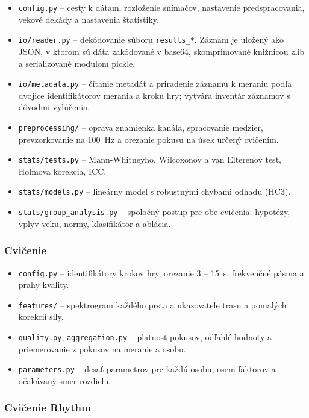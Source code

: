 \documentclass[12pt,a4paper]{article}
\begin{document}
\begin{itemize}
  \item \texttt{config.py} -- cesty k dátam, rozloženie snímačov, nastavenie predspracovania, vekové dekády
        a nastavenia štatistiky.
  \item \texttt{io/reader.py} -- dekódovanie súboru \texttt{results\_*}. Záznam je uložený ako JSON, v ktorom sú
        dáta zakódované v base64, skomprimované knižnicou zlib a serializované modulom pickle.
  \item \texttt{io/metadata.py} -- čítanie metadát a priradenie záznamu k meraniu podľa dvojice identifikátorov
        merania a kroku hry; vytvára inventár záznamov s dôvodmi vylúčenia.
  \item \texttt{preprocessing/} -- oprava znamienka kanála, spracovanie medzier, prevzorkovanie na 100~Hz
        a orezanie pokusu na úsek určený cvičením.
  \item \texttt{stats/tests.py} -- Mann-Whitneyho, Wilcoxonov a van Elterenov test, Holmova korekcia, ICC.
  \item \texttt{stats/models.py} -- lineárny model s robustnými chybami odhadu (HC3).
  \item \texttt{stats/group\_analysis.py} -- spoločný postup pre obe cvičenia: hypotézy, vplyv veku, normy,
        klasifikátor a ablácia.
\end{itemize}

\subsubsection{Cvičenie \ef{}}

\begin{itemize}
  \item \texttt{config.py} -- identifikátory krokov hry, orezanie 3 -- 15~s, frekvenčné pásma a prahy kvality.
  \item \texttt{features/} -- spektrogram každého prsta a ukazovatele trasu a pomalých korekcií sily.
  \item \texttt{quality.py}, \texttt{aggregation.py} -- platnosť pokusov, odľahlé hodnoty a priemerovanie
        z pokusov na meranie a osobu.
  \item \texttt{parameters.py} -- desať parametrov pre každú osobu, osem faktorov a očakávaný smer rozdielu.
\end{itemize}

\subsubsection{Cvičenie Rhythm}
\end{document}
